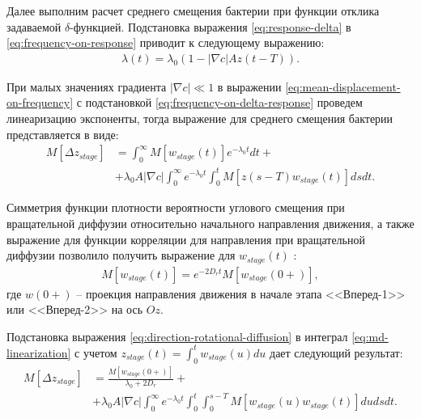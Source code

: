 Далее выполним расчет среднего смещения бактерии при функции отклика задаваемой $\delta$-функцией. Подстановка выражения \cref{eq:response-delta} в \cref{eq:frequency-on-response} приводит к следующему выражению:
\begin{equation}
    \begin{aligned}
        \lambda(t)=\lambda_0 \left ( 1 - |\nabla c| Az(t-T) \right ).
    \label{eq:frequency-on-delta-response}
    \end{aligned}
\end{equation}

При малых значениях градиента $|\nabla c| \ll 1$ в выражении \cref{eq:mean-displacement-on-frequency} с подстановкой \cref{eq:frequency-on-delta-response} проведем линеаризацию экспоненты, тогда выражение для среднего смещения бактерии представляется в виде:
\begin{equation}
    \begin{aligned}
        M[\Delta z_{stage}]&=\int_0^{\infty} M[w_{stage}(t)] e^{-\lambda_0 t}dt + \\ &+ \lambda_0 A |\nabla c|  \int_0^{\infty} e^{-\lambda_0 t} \int_0^t M[z(s-T)w_{stage}(t)]ds dt.
    \label{eq:md-linearization}
    \end{aligned}
\end{equation}

Симметрия функции плотности вероятности углового смещения при вращательной диффузии относительно начального направления движения, а также выражение для функции корреляции для направления при вращательной диффузии позволило получить выражение для $w_{stage}(t)$ \cite{locsei_persistence_2007}:
\begin{equation}
    \begin{aligned}
        M[w_{stage}(t)] = e^{-2 D_r t}M[w_{stage}(0+)],
    \label{eq:direction-rotational-diffusion}
    \end{aligned}
\end{equation}
где $w(0+)$ -- проекция направления движения в начале этапа <<Вперед-1>> или <<Вперед-2>> на ось $Oz$.

Подстановка выражения \cref{eq:direction-rotational-diffusion} в интеграл \cref{eq:md-linearization} с учетом $z_{stage}(t) = \int_{0}^{t} w_{stage}(u)du$ дает следующий результат:
\begin{equation}
    \begin{aligned}
        M[\Delta z_{stage}]&=\frac{M[w_{stage}(0+)]}{\lambda_0+2 D_r} + \\ &+ \lambda_0 A |\nabla c|  \int_0^{\infty} e^{-\lambda_0 t} \int_0^t \int_0^{s-T} M[w_{stage}(u)w_{stage}(t)]du ds dt.
    \label{eq:mdl-with-rotational-diffusion}
    \end{aligned}
\end{equation}

